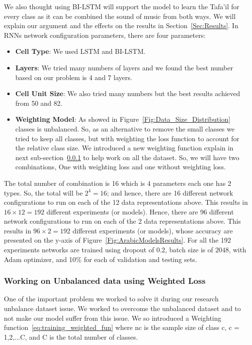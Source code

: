 We also thought using BI-LSTM will support the model to learn the Tafa'il for every class as it can be combined the sound of music from both ways. We will explain our argument and the effects on the results in Section~\ref{Sec:Results}.
In RNNs network configuration parameters, there are four parameters:
\begin{itemize}
  \item \textbf{Cell Type}: We used LSTM and BI-LSTM.
  \item \textbf{Layers}: We tried many numbers of layers and we found the best number based on our problem is 4 and 7 layers.
  \item \textbf{Cell Unit Size}: We also tried many numbers but the best results achieved from 50 and 82.
  \item \textbf{Weighting Model}: As showed in Figure~\ref{Fig:Data_Size_Distribution} classes is unbalanced. So, as an alternative to remove the small classes we tried to keep all classes, but with weighting the loss function to account for the relative class size. We introduced a new weighting function explain in next sub-section~\ref{Sec:W_Loss} to help work on all the dataset. So, we will have two combinations, One with weighting loss and one without weighting loss.
  
\end{itemize}

The total number of combination is 16 which is $4$ parameters each one has $2$ types. So, the total will be $2^4=16$; and hence, there are 16 different network configurations to run on each of the 12 data representations above. This results in $16 \times 12 = 192$ different experiments (or models). Hence, there are 96 different network configurations to run on each of the 2 data representations above. This results in $96 \times 2 = 192$ different experiments (or models), whose accuracy are presented on the y-axis of Figure~\ref{Fig:ArabicModelsResults}. For all the 192 experiments networks are trained using dropout of $0.2$, batch size is of $2048$, with Adam optimizer, and 10\% for each of validation and testing sets.


\subsubsection{Working on Unbalanced data using Weighted Loss}\label{Sec:W_Loss}

One of the important problem we worked to solve it during our research unbalance dataset issue. We worked to overcome the unbalanced dataset and to not make our model suffer from this issue. We so introduced a Weighting function~\ref{eq:training_weighted_fun} where nc is the sample size of class c, c = 1,2,...C, and C is the total number of classes.

